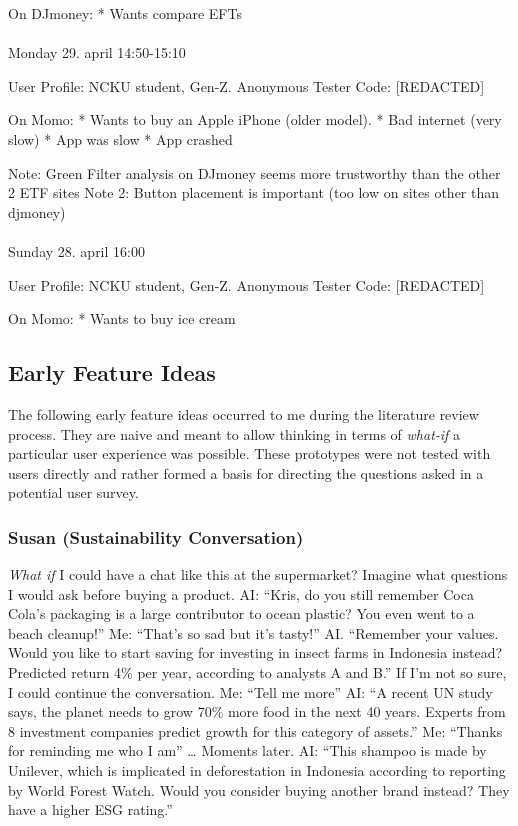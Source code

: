\documentclass[
  12pt,
  letterpaper,
  DIV=11,
  numbers=noendperiod]{scrartcl}
\makeatletter
\let\oldparagraph\paragraph
\renewcommand{\paragraph}{
    \@ifstar
      \xxxParagraphStar
      \xxxParagraphNoStar
  }
\newcommand{\xxxParagraphStar}[1]{\oldparagraph*{#1}\mbox{}}
\newcommand{\xxxParagraphNoStar}[1]{\oldparagraph{#1}\mbox{}}
\makeatother
\begin{document}
On DJmoney: * Wants compare EFTs

\paragraph{Monday 29. april
14:50-15:10}\label{monday-29.-april-1450-1510}

User Profile: NCKU student, Gen-Z. Anonymous Tester Code: {[}REDACTED{]}

On Momo: * Wants to buy an Apple iPhone (older model). * Bad internet
(very slow) * App was slow * App crashed

Note: Green Filter analysis on DJmoney seems more trustworthy than the
other 2 ETF sites Note 2: Button placement is important (too low on
sites other than djmoney)

\paragraph{Sunday 28. april 16:00}\label{sunday-28.-april-1600}

User Profile: NCKU student, Gen-Z. Anonymous Tester Code: {[}REDACTED{]}

On Momo: * Wants to buy ice cream

\newpage

\subsection{Early Feature Ideas}\label{early-feature-ideas}

The following early feature ideas occurred to me during the literature
review process. They are naive and meant to allow thinking in terms of
\emph{what-if} a particular user experience was possible. These
prototypes were not tested with users directly and rather formed a basis
for directing the questions asked in a potential user survey.

\subsubsection{Susan (Sustainability
Conversation)}\label{susan-sustainability-conversation}

\emph{What if} I could have a chat like this at the supermarket? Imagine
what questions I would ask before buying a product. AI: ``Kris, do you
still remember Coca Cola's packaging is a large contributor to ocean
plastic? You even went to a beach cleanup!'' Me: ``That's so sad but
it's tasty!'' AI. ``Remember your values. Would you like to start saving
for investing in insect farms in Indonesia instead? Predicted return 4\%
per year, according to analysts A and B.'' If I'm not so sure, I could
continue the conversation. Me: ``Tell me more'' AI: ``A recent UN study
says, the planet needs to grow 70\% more food in the next 40 years.
Experts from 8 investment companies predict growth for this category of
assets.'' Me: ``Thanks for reminding me who I am'' \ldots{} Moments
later. AI: ``This shampoo is made by Unilever, which is implicated in
deforestation in Indonesia according to reporting by World Forest Watch.
Would you consider buying another brand instead? They have a higher ESG
rating.''
\end{document}
